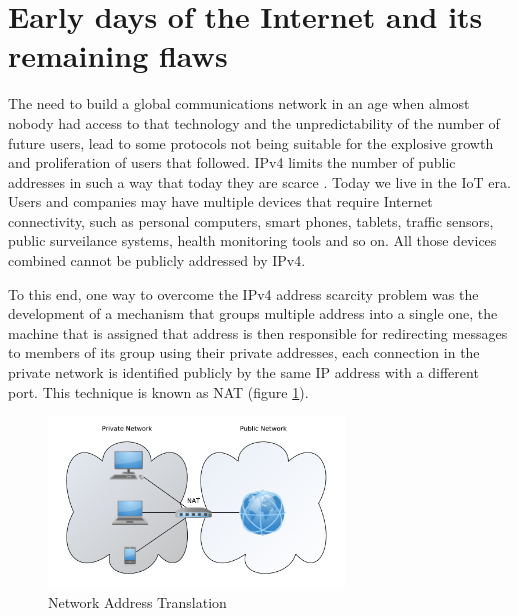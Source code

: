 \section{Early days of the Internet and its remaining flaws}\label{early}

The need to build a global communications network in an age when almost nobody had access to that technology and the unpredictability of the number of future users, lead to some protocols not being suitable for the explosive growth and proliferation of users that followed. \ac{IPv4} limits the number of public addresses in such a way that today they are scarce \cite{ipv4}. Today we live in the \ac{IoT} era.
  Users and companies may have multiple devices that require Internet connectivity, such as personal computers, smart phones, tablets, traffic sensors, public surveilance systems, health monitoring tools and so on. All those devices combined cannot be publicly addressed by \ac{IPv4}.

To this end, one way to overcome the \ac{IPv4} address scarcity problem was the development of a mechanism that groups multiple address into a single one, the machine that is assigned that address is then responsible for redirecting messages to members of its group using their private addresses, each connection in the private network is identified publicly by the same \ac{IP} address with a different port.
This technique is known as \ac{NAT} (figure \ref{fig:nat}).

\begin{figure}[!htb]
	\centering
	\includegraphics[width=0.7\textwidth]{figures/nat.pdf}
	\caption{Network Address Translation}
	\label{fig:nat}
\end{figure}

